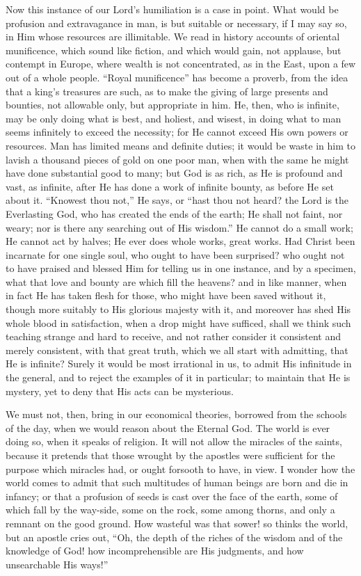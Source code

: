 Now this instance of our Lord's humiliation is a case in point.
What would be profusion and extravagance in man, is but suitable or
necessary, if I may say so, in Him whose resources are illimitable. We
read in history accounts of oriental munificence, which sound like
fiction, and which would gain, not applause, but contempt in Europe,
where wealth is not concentrated, as in the East, upon a few out of a
whole people. ``Royal munificence'' has become a proverb, from
the idea that a king's treasures are such, as to make the giving of
large presents and bounties, not allowable only, but appropriate in
him. He, then, who is infinite, may be only doing what is best, and
holiest, and wisest, in doing what to man seems infinitely to exceed
the necessity; for He cannot exceed His own powers or resources. Man
has limited means and definite duties; it would be waste in him to
lavish a thousand pieces of gold on one poor man, when with the same
he might have done substantial good to many; but God is as rich, as He
is profound and vast, as infinite, after He has done a work of
infinite bounty, as before He set about it. ``Knowest thou
not,'' He says, or ``hast thou not heard? the Lord is the
Everlasting God, who has created the ends of the earth; He shall not
faint, nor weary; nor is there any searching out of His wisdom.''
He cannot do a small work; He cannot act by halves; He ever does whole
works, great works. Had Christ been incarnate for one single soul, who
ought to have been surprised? who ought not to have praised and
blessed Him for telling us in one instance, and by a specimen, what
that love and bounty are which fill the heavens? and in like manner,
when in fact He has taken flesh for those, who might have been saved
without it, though more suitably to His glorious majesty with it, and
moreover has shed His whole blood in satisfaction, when a drop might
have sufficed, shall we think such teaching strange and hard to
receive, and not rather consider it consistent and merely consistent,
with that great truth, which we all start with admitting, that He is
infinite? Surely it would be most irrational in us, to admit His
infinitude in the general, and to reject the examples of it in
particular; to maintain that He is mystery, yet to deny that His acts
can be mysterious.

We must not, then, bring in our economical theories, borrowed from
the schools of the day, when we would reason about the Eternal God.
The world is ever doing so, when it speaks of religion. It will not
allow the miracles of the saints, because it pretends that those
wrought by the apostles were sufficient for the purpose which miracles
had, or ought forsooth to have, in view. I wonder how the world comes
to admit that such multitudes of human beings are born and die in
infancy; or that a profusion of seeds is cast over the face of the
earth, some of which fall by the way-side, some on the rock, some
among thorns, and only a remnant on the good ground. How wasteful was
that sower! so thinks the world, but an apostle cries out, ``Oh,
the depth of the riches of the wisdom and of the knowledge of God! how
incomprehensible are His judgments, and how unsearchable His
ways!''

